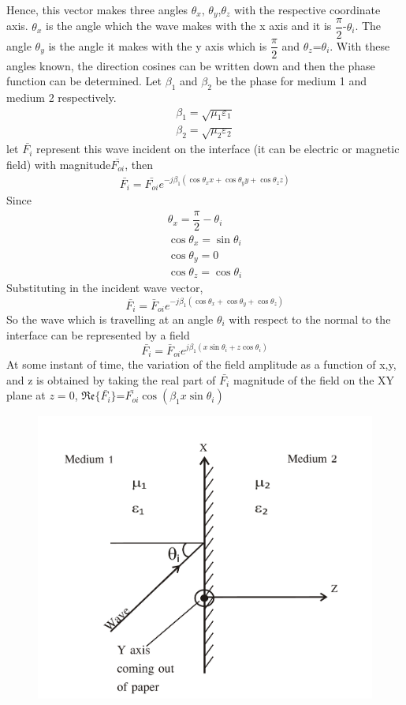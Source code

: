 Hence, this vector makes three angles $\theta_x$, $\theta_y$,$\theta_z$ with the respective coordinate axis. $\theta_x$ is the angle which the wave makes with the x axis and it is $\dfrac{\pi}{2}$-$\theta_i$. The angle $\theta_y$ is the angle it makes with the y axis which is $\dfrac{\pi}{2}$ and $\theta_z$=$\theta_i$. With these angles known, the direction cosines can be written down and then the phase function can be determined. Let $\beta_1$ and $\beta_2$ be the phase for medium 1 and medium 2 respectively.
\begin{align*}
\beta_1=\sqrt{\mu_1\varepsilon_1}\\
\beta_2=\sqrt{\mu_2\varepsilon_2}
\end{align*}
let $\bar{F_i}$ represent this wave incident on the interface (it can be electric or magnetic field) with magnitude$\bar{F_{oi}}$, then
\begin{align*}
\bar{F_{i}}=\bar{F_{oi}}e^{-j\beta_1(\cos\theta_xx +\cos\theta_yy+\cos\theta_zz)}
\end{align*}
Since
\begin{align*}
\theta_x=\dfrac{\pi}{2}-\theta_i\\
\cos\theta _x=\sin \theta_i\\
\cos \theta_y=0\\
\cos\theta_z=\cos \theta_i
\end{align*}
Substituting in the incident wave vector,
$$\bar{F_i}=\bar{F}_{oi}e^{-j\beta_1(\cos \theta_x+\cos \theta_y+\cos \theta_z)}$$
So the wave  which is travelling at an angle $\theta_i$ with respect to the normal to the interface can be represented by a field
$$\bar{F_i}=\bar{F}_{oi}e^{j\beta_1(x\sin \theta_i+z\cos \theta_i)} $$
At some instant of time, the variation of the field amplitude as a function of x,y, and z is obtained by taking the real part of $\bar{F_i}$ magnitude of the field on the XY plane at $z=0$, $\mathfrak{Re}\{\bar{F_i}\}$=$\bar{F_{oi}}\cos (\beta_1x\sin \theta_i)$
\begin{figure}[h]
\centering
\includegraphics[width=.8\linewidth]{graphics/group30b}
\caption{}
\label{fig:group30b}
\end{figure}

